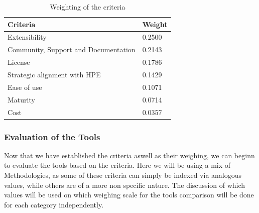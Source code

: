 \begin{table}[htb]
    \centering
    \begin{tabular}{|l|l|} \hline
        \textbf{Criteria}                       & \textbf{Weight}       \\ \hline
        Extensibility                           &  0.2500               \\ \hline
        Community, Support and  Documentation   &  0.2143               \\ \hline
        License                                 &  0.1786               \\ \hline
        Strategic alignment with \ac{HPE}       &  0.1429               \\ \hline
        Ease of use                             &  0.1071               \\ \hline
        Maturity                                &  0.0714               \\ \hline
        Cost                                    &  0.0357               \\ \hline

    \end{tabular}
    \caption{Weighting of the criteria}
    \label{tab:weighting_of_the_criteria}
\end{table}

\subsubsection{Evaluation of the Tools}

Now that we have established the criteria aswell as their weighing, we can beginn to evaluate the tools based on the criteria.
Here we will be using a mix of Methodologies, as some of these criteria can simply be indexed via analogous values, while others are of a more non specific nature.
The discussion of which values will be used on which weighing scale for the tools comparison will be done for each category independently. 

